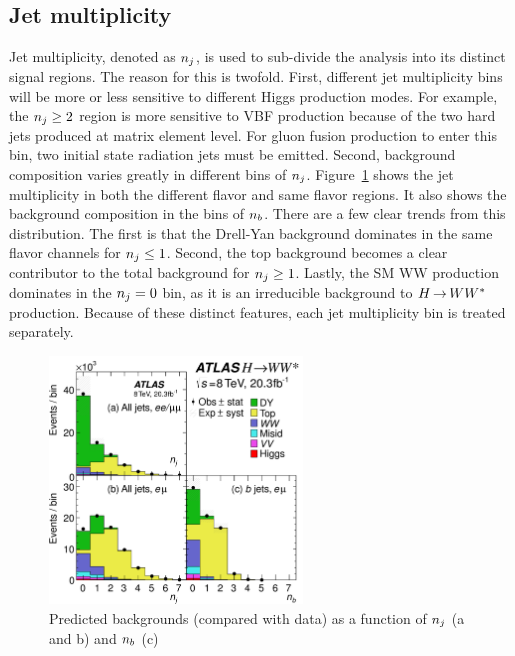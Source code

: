 \subsection{Jet multiplicity}
\label{sec:jetmult}
Jet multiplicity, denoted as $n_j$, is used to sub-divide the analysis into its distinct signal regions. The reason for this is twofold. First, different jet multiplicity bins will be more or less sensitive to different Higgs production modes. For example, the $n_j \geq 2$ region is more sensitive to VBF production because of the two hard jets produced at matrix element level. For gluon fusion production to enter this bin, two initial state radiation jets must be emitted. Second, background composition varies greatly in different bins of $n_j$. Figure~\ref{fig:njet} shows the jet multiplicity in both the different flavor and same flavor regions. It also shows the background composition in the bins of $n_b$. There are a few clear trends from this distribution. The first is that the Drell-Yan background dominates in the same flavor channels for $n_j \leq 1$. Second, the top background becomes a clear contributor to the total background for $n_j \geq 1$. Lastly, the SM WW production dominates in the $n_j = 0$ bin, as it is an irreducible background to $H{\,{\rightarrow}\,}WW^\ast$ production. Because of these distinct features, each jet multiplicity bin is treated separately.

\begin{figure}[h!]
  \centering
  \captionsetup{justification=centering}

  \includegraphics[width=0.6\textwidth]{figures/njet}
  \caption{Predicted backgrounds (compared with data) as a function of $n_j$ (a and b) and $n_b$ (c)}
  \label{fig:njet}
\end{figure}

